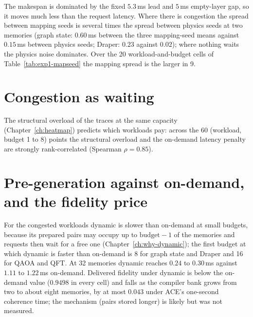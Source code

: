 


The makespan is dominated by the fixed $5.3$\,ms lead and $5$\,ms empty-layer gap, so it moves much less than the request latency. Where there is congestion the spread between mapping seeds is several times the spread between physics seeds at two memories (graph state: $0.60$\,ms between the three mapping-seed means against $0.15$\,ms between physics seeds; Draper: $0.23$ against $0.02$); where nothing waits the physics noise dominates. Over the 20 workload-and-budget cells of Table~\ref{tab:exp1-mapseed} the mapping spread is the larger in 9.

\section{Congestion as waiting}



The structural overload of the traces at the same capacity (Chapter~\ref{ch:heatmap}) predicts which workloads pay: across the 60 (workload, budget 1 to 8) points the structural overload and the
on-demand latency penalty are strongly rank-correlated (Spearman $\rho=0.85$).

\section{Pre-generation against on-demand, and the fidelity price}



For the congested workloads dynamic is slower than on-demand at small budgets, because its prepared pairs may occupy up to $\text{budget}-1$ of the memories and requests then wait for a free one (Chapter~\ref{ch:why-dynamic}); the first budget at which
dynamic is faster than on-demand is 8 for graph state and Draper and 16 for QAOA and QFT. At 32 memories dynamic reaches $0.24$ to $0.30$\,ms against $1.11$ to $1.22$\,ms on-demand. Delivered fidelity under
dynamic is below the on-demand value ($0.9498$ in every cell) and falls as the compiler bank grows from two to about eight memories, by at most $0.043$ under ACE's one-second coherence time; the mechanism (pairs stored longer) is likely but was not measured.

